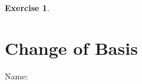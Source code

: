 \documentclass[10pt]{book}
\theoremstyle{definition}
\newtheorem{exercise}{Exercise}[section]
\newcommand{\name}[1][2.5in]{\vspace{-2.3em}\hfill Name: \underline{\hspace{#1}}}
\DeclareMathOperator{\Nul}{Nul}
\DeclareMathOperator{\Col}{Col}
\DeclareMathOperator{\Row}{Row}
\begin{document}
\begin{exercise}
	
%
%
\end{exercise}
\vspace{1in}


\newpage


\section{Change of Basis}
\name
\end{document}
